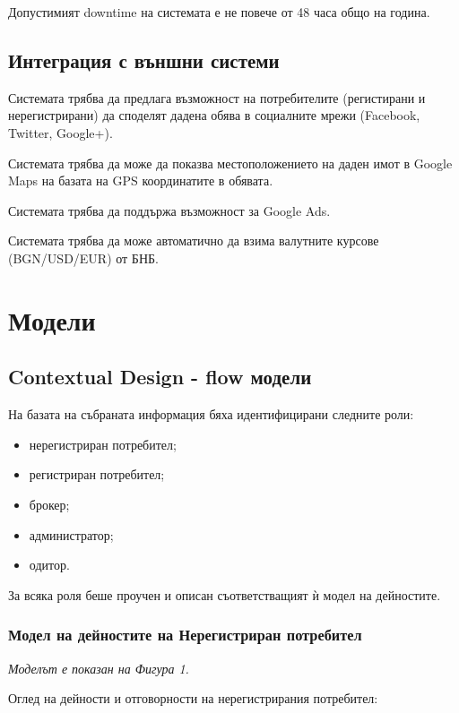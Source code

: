 \documentclass[a4paper]{article}
\begin{document}
Допустимият downtime на системата е не повече от 48 часа общо на година.

\subsection{Интеграция с външни системи}

Системата трябва да предлага възможност на потребителите (регистирани и нерегистрирани) да споделят дадена обява в социалните мрежи (Facebook, Twitter, Google+).

Системата трябва да може да показва местоположението на даден имот в Google Maps на базата на GPS координатите в обявата.

Системата трябва да поддържа възможност за Google Ads.

Системата трябва да може автоматично да взима валутните курсове (BGN/USD/EUR) от БНБ.	



\section{Модели} \label{cdmodels}

\subsection{Contextual Design - flow модели}
На базата на събраната информация бяха идентифицирани следните роли:
\begin{itemize}
	\item нерегистриран потребител;
	\item регистриран потребител;
	\item брокер;
	\item администратор;
	\item одитор.
\end{itemize}
За всяка роля беше проучен и описан съответстващият ѝ модел на дейностите.

\subsubsection{Модел на дейностите на Нерегистриран потребител}
	
\emph{Моделът е показан на Фигура 1.} 

Оглед на дейности и отговорности на нерегистрирания потребител:
	
\end{document}

